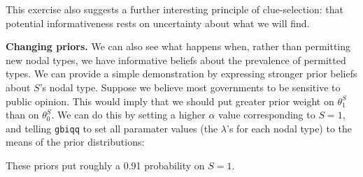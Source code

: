 \documentclass[12pt,]{book}
\newenvironment{Shaded}{\begin{snugshade}}{\end{snugshade}}
\newcommand{\CommentTok}[1]{\textcolor[rgb]{0.56,0.35,0.01}{\textit{#1}}}
\newcommand{\DataTypeTok}[1]{\textcolor[rgb]{0.13,0.29,0.53}{#1}}
\newcommand{\DecValTok}[1]{\textcolor[rgb]{0.00,0.00,0.81}{#1}}
\newcommand{\KeywordTok}[1]{\textcolor[rgb]{0.13,0.29,0.53}{\textbf{#1}}}
\newcommand{\NormalTok}[1]{#1}
\newcommand{\OperatorTok}[1]{\textcolor[rgb]{0.81,0.36,0.00}{\textbf{#1}}}
\newcommand{\OtherTok}[1]{\textcolor[rgb]{0.56,0.35,0.01}{#1}}
\newcommand{\StringTok}[1]{\textcolor[rgb]{0.31,0.60,0.02}{#1}}
\begin{document}
This exercise also suggests a further interesting principle of clue-selection: that potential informativeness rests on uncertainty about what we will find.

\textbf{Changing priors.} We can also see what happens when, rather than permitting new nodal types, we have informative beliefs about the prevalence of permitted types. We can provide a simple demonstration by expressing stronger prior beliefs about \(S\)'s nodal type. Suppose we believe most governments to be sensitive to public opinion. This would imply that we should put greater prior weight on \(\theta^S_1\) than on \(\theta^S_0\). We can do this by setting a higher \(\alpha\) value corresponding to \(S=1\), and telling \texttt{gbiqq} to set all paramater values (the \(\lambda\)'s for each nodal type) to the means of the prior distributions:

\begin{Shaded}
\end{Shaded}

These priors put roughly a 0.91 probability on \(S=1\).
\end{document}
